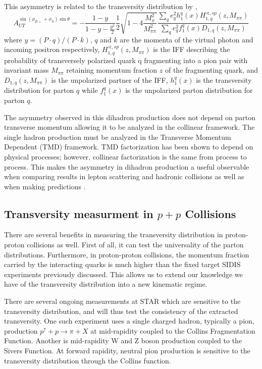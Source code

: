 \documentclass[letterpaper, abstract = on,listof=totoc, bibliography=totoc]{scrreprt}
\begin{document}
This asymmetry is related to the transversity distribution by \cite{hermesRes},
 \begin{equation}
A_{UT}^{\sin(\phi_{R\perp}+\phi_S)\sin\theta} = - \frac{1-y}{1-y-\frac{y^2}{2}}\frac{1}{2}\sqrt{1-4\frac{M_\pi^2}{M_{\pi\pi}^2}}\frac{\sum\limits_q e_q^2h_1^q(x)H_{1,q}^{\sphericalangle,sp}(z,M_{\pi\pi})}{\sum\limits_q e_q^2f_1^q(x)D_{1,q}(z,M_{\pi\pi})}
\end{equation}
where $y = (P\cdot q)/(P\cdot k)$, $q$ and $k$ are the momenta of the virtual photon and incoming positron respectively, $H_{1,q}^{\sphericalangle,sp}(z,M_{\pi\pi})$ is the IFF describing the probability of transversely polarized quark q fragmenting into a pion pair with invariant mass $M_{\pi\pi}$ retaining momentum fraction $z$ of the fragmenting quark, and $D_{1,q}(z,M_{\pi\pi})$ is the unpolarized partner of the IFF, $h_1^q(x)$ is the transversity distribution for parton $q$ while $f_1^q(x)$ is the unpolarized parton distribution for parton $q$.

The asymmetry observed in this dihadron production does not depend on parton transverse momentum allowing it to be analyzed in the collinear framework. The single hadron production must be analyzed in the Transverse Momentum Dependent (TMD) framework. TMD factorization has been shown to depend on physical processes; however, collinear factorization is the same from process to process. This makes the asymmetry in dihadron production a useful observable when comparing results in lepton scattering and hadronic collisions as well as when making predictions \cite{univTrans}.  
  

\subsection{Transversity measurment in $p+p$ Collisions}
There are several benefits in measuring the transversity distribution in proton-proton collisions as well. First of all, it can test the universality of the parton distributions. Furthermore, in proton-proton collisions, the momentum fraction carried by the interacting quarks is much higher than the fixed target SIDIS experiments previously discussed. This allows us to extend our knowledge we have of the transversity distribution into a new kinematic regime. 

There are several ongoing measurements at STAR which are sensitive to the transversity distribution, and will thus test the consistency of the extracted transversity. One such experiment uses a single charged hadron, typically a pion, production $p^\uparrow + p \rightarrow \pi + X$ at mid-rapidity coupled to the Collins Fragmentation Function. Another is mid-rapidity W and Z boson production coupled to the Sivers Function. At forward rapidity, neutral pion production is sensitive to the transversity distribution through the Collins function. 
\end{document}
